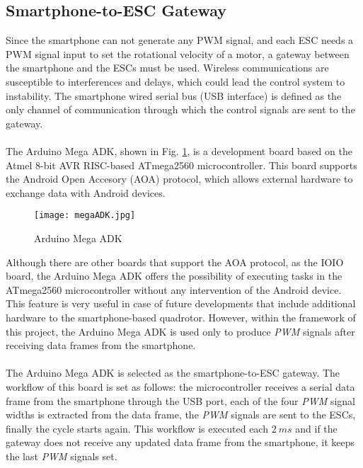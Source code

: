 \subsection{Smartphone-to-ESC Gateway}
Since the smartphone can not generate any PWM signal, and each ESC needs a PWM signal input to set the rotational velocity of a motor, a gateway between the smartphone and the ESCs must be used. Wireless communications are susceptible to interferences and delays, which could lead the control system to instability. The smartphone wired serial bus (USB interface) is defined as the only channel of communication through which the control signals are sent to the gateway.
\\\\
The Arduino Mega ADK, shown in Fig. \ref{fig:megaadk}, is a development board based on the Atmel 8-bit AVR RISC-based ATmega2560 microcontroller.  This board supports the Android Open Accesory (AOA) protocol, which allows external hardware to exchange data with Android devices.
\begin{figure}[H]
\begin{center}
\texttt{[image: megaADK.jpg]}    
\caption[Arduino Mega ADK]{Arduino Mega ADK\protect\footnotemark} 
\label{fig:megaadk}
\end{center}
 \end{figure}
\vspace{-0.5cm}
Although there are other boards that support the AOA protocol, as the IOIO board, the Arduino Mega ADK offers the possibility of executing tasks in the ATmega2560 microcontroller without any intervention of the Android device. This feature is very useful in case of future developments that include additional hardware to the smartphone-based quadrotor. However, within the framework of this project, the Arduino Mega ADK is used only to produce \textit{PWM} signals after receiving data frames from the smartphone.
\\\\
The Arduino Mega ADK is selected as the smartphone-to-ESC gateway. The workflow of this board is set as follows: the microcontroller receives a serial data frame from the smartphone through the USB port, each of the four \textit{PWM} signal widths is extracted from the data frame, the \textit{PWM} signals are sent to the ESCs, finally the cycle starts again. This workflow is executed each $2\ ms$ and if the gateway does not receive any updated data frame from the smartphone, it keeps the last \textit{PWM} signals set.

